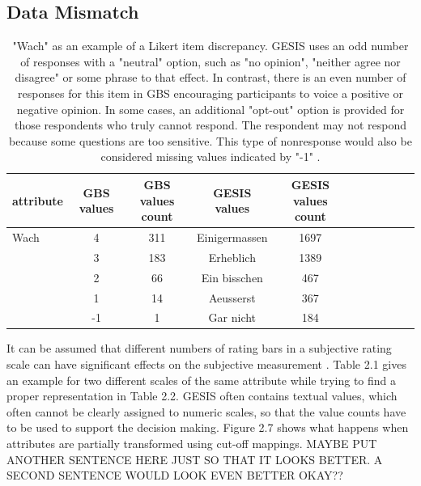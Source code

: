 \subsection{Data Mismatch}

\begin{table}[ht]
    \begin{center}
	\captionsetup{width= 400pt}
            {\footnotesize
            \begin{tabular}{l|c|ccccccccc}
                \hline \hline
		attribute & GBS values & GBS values count &  GESIS values & GESIS values count \\
                \hline \hline
                     Wach & 4 & 311 & Einigermassen & 1697 \\
                     & 3 & 183 & Erheblich & 1389 \\
                     & 2 & 66 & Ein bisschen & 467 \\ 
              	& 1 & 14 & Aeusserst & 367 \\	
		& -1 & 1 & Gar nicht & 184 \\		
	     \hline \hline
            \end{tabular}}
        \caption{"Wach" as an example of a Likert item discrepancy. GESIS uses an odd number of responses with a "neutral" option, such as "no opinion", "neither agree nor disagree" or some phrase to that effect. In contrast, there is an even number of responses for this item in GBS encouraging participants to voice a positive or negative opinion. In some cases, an additional "opt-out" option is provided for those respondents who truly cannot respond. The respondent may not respond because some questions are too sensitive. This type of nonresponse would also be considered missing values indicated by "-1" \cite{likert4}.}
\end{center}
\end{table}

It can be assumed that different numbers of rating bars in a subjective rating scale can have significant effects on the subjective measurement \cite{heeringa}. Table 2.1 gives an example for two different scales of the same attribute while trying to find a proper representation in Table 2.2. GESIS often contains textual values, which often cannot be clearly assigned to numeric scales, so that the value counts have to be used to support the decision making. Figure 2.7 shows what happens when attributes are partially transformed using cut-off mappings. MAYBE PUT ANOTHER SENTENCE HERE JUST SO THAT IT LOOKS BETTER. A SECOND SENTENCE WOULD LOOK EVEN BETTER OKAY??

